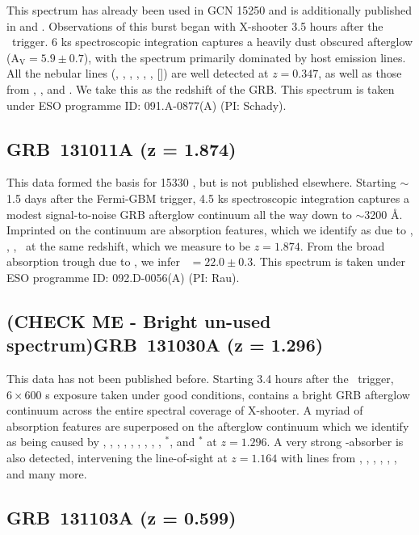 \documentclass{aa}    %
\begin{document}
This spectrum has already been used in GCN 15250 \citep{GCN15250} and is
additionally published in \citet{Schady2015} and \citet{Kruhler2015}.
Observations of this burst began with X-shooter 3.5 hours after the
\swift~trigger. 6 ks spectroscopic integration captures a heavily dust obscured
afterglow (A$_\mathrm{V} = 5.9 \pm 0.7$\citep{Greiner2014}), with the spectrum
primarily dominated by host emission lines. All the nebular lines (\oii, \hg,
\hb, \oii, \ha, \nii, [\sii]) are well detected at $z = 0.347$, as well as those
from \pad, \pag, and \pab. We take this as the redshift of the GRB. This
spectrum is taken under ESO programme ID: 091.A-0877(A) (PI: Schady).

\subsection{GRB~131011A (z = 1.874)}\label{131011}

This data formed the basis for 15330 \citep{GCN15330}, but is not published
elsewhere. Starting $\sim$1.5 days after the Fermi-GBM trigger, 4.5 ks
spectroscopic integration captures a modest signal-to-noise GRB afterglow
continuum all the way down to $\sim$3200 \AA. Imprinted on the continuum are
absorption features, which we identify as due to \lya, \feii,  \mgii, \mgi~at
the same redshift, which we measure to be $z = 1.874$. From the broad absorption
trough due to \lya, we infer \nh~$= 22.0 \pm 0.3$. This spectrum is taken under
ESO programme ID: 092.D-0056(A) (PI: Rau).

\subsection{(CHECK ME - Bright un-used spectrum)GRB~131030A (z = 1.296)}	
\label{131030}

This data has not been published before. Starting 3.4 hours after the
\swift~trigger, $6\times600$ s exposure taken under good conditions, contains a
bright GRB afterglow continuum across the entire spectral coverage of X-shooter.
A myriad of absorption features are superposed on the afterglow continuum which
we identify as being caused by \SIiv, \SIii, \civ, \alii, \aliii, \znii, \crii,
\NIii, \feii, \NIii$^*$, and \feii$^*$ at $z = 1.296$. A very strong
\mgii-absorber is also detected, intervening the line-of-sight at $z = 1.164$
with lines from \SIii, \civ, \aliii, \aliii, \feii, \mnii, and many more.

\subsection{GRB~131103A (z = 0.599)}\label{131103}
\end{document}
